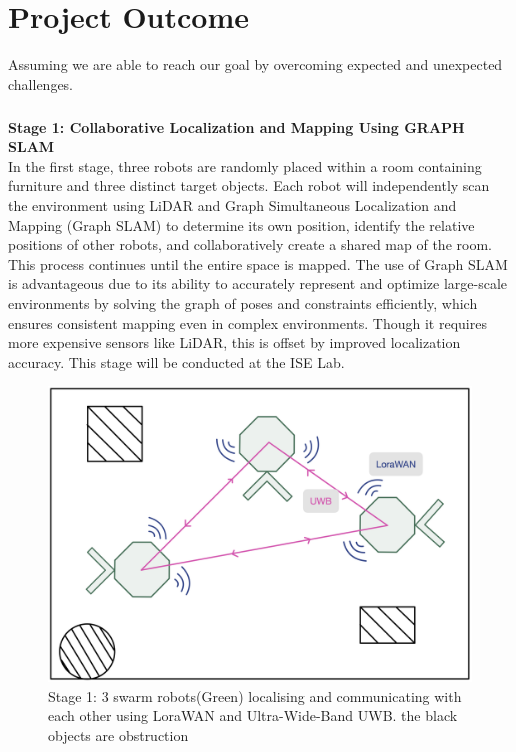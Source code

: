 \chapter{Project Outcome}

Assuming we are able to reach our goal by overcoming expected and unexpected challenges. 

\paragraph*{}
\textbf{Stage 1: Collaborative Localization and Mapping Using GRAPH SLAM} \\
In the first stage, three robots are randomly placed within a room containing furniture and three distinct target objects. Each robot will independently scan the environment using LiDAR and Graph Simultaneous Localization and Mapping (Graph SLAM) to determine its own position, identify the relative positions of other robots, and collaboratively create a shared map of the room. This process continues until the entire space is mapped. The use of Graph SLAM is advantageous due to its ability to accurately represent and optimize large-scale environments by solving the graph of poses and constraints efficiently, which ensures consistent mapping even in complex environments. Though it requires more expensive sensors like LiDAR, this is offset by improved localization accuracy. This stage will be conducted at the ISE Lab.

\begin{figure}
    \centering
    \includegraphics[width=0.5\linewidth]{assets/images/project_outcome/stage_1.png}
    \caption{Stage 1: 3 swarm robots(Green) localising and communicating with each other using LoraWAN and Ultra-Wide-Band UWB. the black objects are obstruction}
    \label{fig:phase1}
\end{figure}

